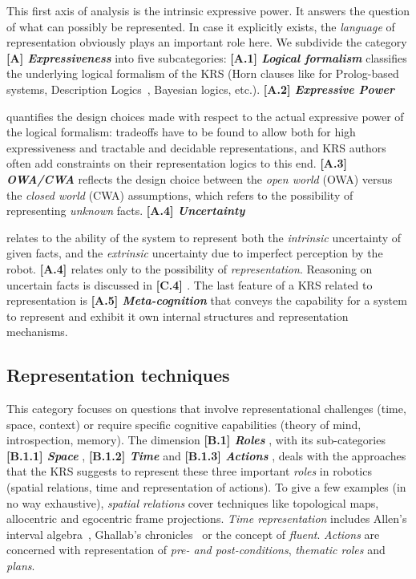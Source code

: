 \documentclass[journal]{IEEEtran}
\newcommand{\taxon}[2]{%
    \textbf{[#1] \emph{#2}}
}
\begin{document}
This first axis of analysis is the intrinsic expressive power. It answers the
question of what can possibly be represented. In case it explicitly exists, the
\emph{language} of representation obviously plays an important role here.
% 
We subdivide the category \taxon{A}{Expressiveness} into five subcategories:
\taxon{A.1}{Logical formalism} classifies the underlying logical formalism of the
KRS (Horn clauses like for Prolog-based systems, Description
Logics~\cite{Baader2008}, Bayesian logics, etc.). \taxon{A.2}{Expressive Power}
quantifies the design choices made with respect to the actual expressive power
of the logical formalism: tradeoffs have to be found to allow both for high
expressiveness and tractable and decidable representations, and KRS authors
often add constraints on their representation logics to this end.
\taxon{A.3}{OWA/CWA} reflects the design choice between the \emph{open world}
(OWA) versus the \emph{closed world} (CWA) assumptions, which refers to the
possibility of representing \emph{unknown} facts. \taxon{A.4}{Uncertainty}
relates to the ability of the system to represent both the \emph{intrinsic}
uncertainty of given facts, and the \emph{extrinsic} uncertainty due to
imperfect perception by the robot. \taxon{A.4}{} relates only to the possibility
of \emph{representation}. Reasoning on uncertain facts is discussed in
\taxon{C.4}{}. The last feature of a KRS related to representation is
\taxon{A.5}{Meta-cognition} that conveys the capability for a system to
represent and exhibit it own internal structures and representation mechanisms.



\subsection{Representation techniques}
\label{sect|higher-level-domain-representation}

This category focuses on questions that involve representational challenges 
(time, space, context) or require specific cognitive capabilities (theory of 
mind, introspection, memory).
% 
The dimension \taxon{B.1}{Roles}, with its sub-categories \taxon{B.1.1}{Space},
\taxon{B.1.2}{Time} and \taxon{B.1.3}{Actions}, deals with the approaches that
the KRS suggests to represent these three important \emph{roles} in robotics
(spatial relations, time and representation of actions). To give a few examples
(in no way exhaustive), \emph{spatial relations} cover techniques like
topological maps, allocentric and egocentric frame projections. \emph{Time
representation} includes Allen's interval algebra~\cite{Allen1984}, Ghallab's
chronicles~\cite{Ghallab1996} or the concept of \emph{fluent}. \emph{Actions}
are concerned with representation of \emph{pre- and post-conditions},
\emph{thematic roles} and \emph{plans}.
\end{document}
